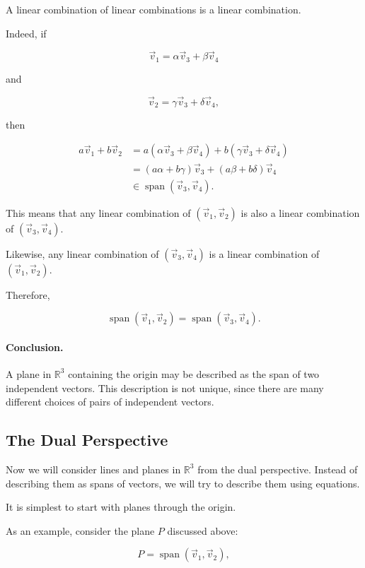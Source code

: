 \begin{center}
A linear combination of linear combinations is a linear combination.
\end{center}

Indeed, if

\[
\vec v_1=\alpha\vec v_3+\beta\vec v_4
\]

and

\[
\vec v_2=\gamma\vec v_3+\delta\vec v_4,
\]

then

\[
\begin{aligned}
a\vec v_1+b\vec v_2
&=
a(\alpha\vec v_3+\beta\vec v_4)
+
b(\gamma\vec v_3+\delta\vec v_4)\\
&=
(a\alpha+b\gamma)\vec v_3
+
(a\beta+b\delta)\vec v_4\\
&\in
\operatorname{span}(\vec v_3,\vec v_4).
\end{aligned}
\]

This means that any linear combination of $(\vec v_1,\vec v_2)$ is also a
linear combination of $(\vec v_3,\vec v_4)$.

Likewise, any linear combination of $(\vec v_3,\vec v_4)$ is a linear
combination of $(\vec v_1,\vec v_2)$.

Therefore,

\[
\operatorname{span}(\vec v_1,\vec v_2)
=
\operatorname{span}(\vec v_3,\vec v_4).
\]

\paragraph{Conclusion.}
A plane in $\mathbb{R}^3$ containing the origin may be described as the span
of two independent vectors. This description is not unique, since there are
many different choices of pairs of independent vectors.

\subsection{The Dual Perspective}

Now we will consider lines and planes in $\mathbb{R}^3$ from the dual
perspective. Instead of describing them as spans of vectors, we will try to
describe them using equations.

It is simplest to start with planes through the origin.

As an example, consider the plane $P$ discussed above:

\[
P=\operatorname{span}(\vec v_1,\vec v_2),
\]

